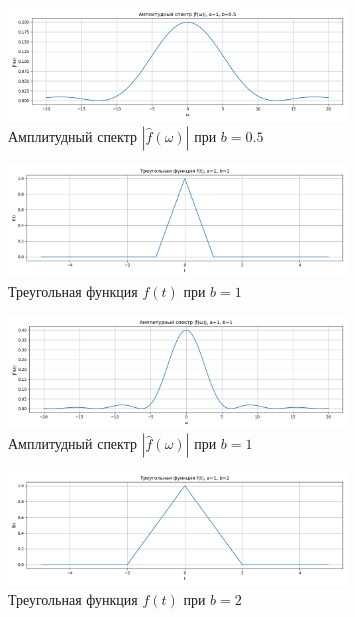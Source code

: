 \begin{figure}[H]
    \centering
    \includegraphics[width=0.8\textwidth]{triangle_spectrum_b0.5.png}
    \caption{Амплитудный спектр $|\hat{f}(\omega)|$ при $b = 0.5$}
\end{figure}

\begin{figure}[H]
    \centering
    \includegraphics[width=0.8\textwidth]{triangle_function_b1.png}
    \caption{Треугольная функция $f(t)$ при $b = 1$}
\end{figure}

\begin{figure}[H]
    \centering
    \includegraphics[width=0.8\textwidth]{triangle_spectrum_b1.png}
    \caption{Амплитудный спектр $|\hat{f}(\omega)|$ при $b = 1$}
\end{figure}

\begin{figure}[H]
    \centering
    \includegraphics[width=0.8\textwidth]{triangle_function_b2.png}
    \caption{Треугольная функция $f(t)$ при $b = 2$}
\end{figure}

